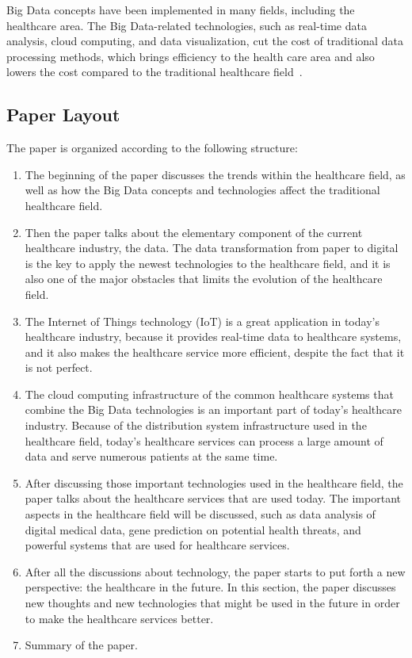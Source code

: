 Big Data concepts have been implemented in many fields, including the 
healthcare area. The Big Data-related technologies, such as real-time 
data analysis, cloud computing, and data visualization, cut the cost of 
traditional data processing methods, which brings efficiency to the health 
care area and also lowers the cost compared to the traditional healthcare 
field~\cite{intro_hb1}. 

\subsection{Paper Layout}
The paper is organized according to the following structure: 
\begin{enumerate}
	\item The beginning of the paper discusses the trends within the 
	healthcare field,
	 as well as how the Big Data concepts and technologies affect the 
	 traditional healthcare field. 
	\item Then the paper talks about the elementary component of the 
	current healthcare industry, the data. The data transformation 
	from paper to digital is the key to apply the newest technologies 
	to the healthcare field, and 
	it is also one of the major obstacles that limits the evolution of the
	 healthcare field. 
	\item The Internet of Things technology (IoT) is a great application in 
	today's healthcare industry, because it provides real-time data to 
	healthcare systems, and it also makes the healthcare service 
	more efficient, despite the fact that it is not perfect.
	\item The cloud computing infrastructure of the common 
	healthcare systems that combine 
	the Big Data technologies is an important part of today's healthcare 
	industry. 
	Because of the distribution system infrastructure used in the healthcare
	field, today's healthcare services can process a large amount of data and 
	serve numerous patients at the same time.
	\item After discussing those important technologies used in the 
	healthcare 
	field, the paper talks about the healthcare services that are used today.
	The important aspects in the healthcare field will be discussed, 
	such as data analysis of digital medical data, gene prediction 
	on potential health threats,
	and powerful systems that are used for healthcare services.
	\item After all the discussions about technology, the paper 
	starts to put forth a new 
	perspective: the healthcare in the future. In this section, 
	the paper discusses new thoughts and 
	new technologies that might be used in the future in order to make the 
	healthcare services better.
	\item Summary of the paper.
	
\end{enumerate}


